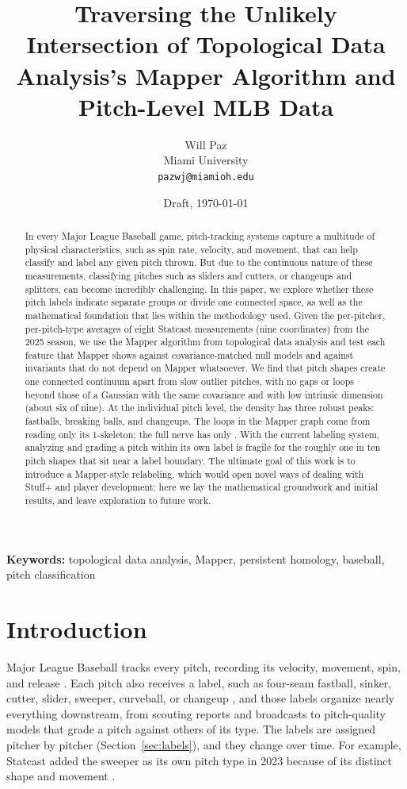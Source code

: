 \documentclass{article}
\title{Traversing the Unlikely Intersection of Topological Data Analysis's Mapper Algorithm and Pitch-Level MLB Data}
\author{Will Paz\\ Miami University\\ \texttt{pazwj@miamioh.edu}}
\date{Draft, \today}
\theoremstyle{definition}
\theoremstyle{remark}
\begin{document}
\maketitle

\begin{abstract}
In every Major League Baseball game, pitch-tracking systems capture a multitude of physical characteristics, such as spin rate, velocity, and movement, that can help classify and label any given pitch thrown.
But due to the continuous nature of these measurements, classifying pitches such as sliders and cutters, or changeups and splitters, can become incredibly challenging.
In this paper, we explore whether these pitch labels indicate separate groups or divide one connected space, as well as the mathematical foundation that lies within the methodology used.
Given the \NShapes{} per-pitcher, per-pitch-type averages of eight Statcast measurements (nine coordinates) from the 2025 season, we use the Mapper algorithm from topological data analysis and test each feature that Mapper shows against covariance-matched null models and against invariants that do not depend on Mapper whatsoever.
We find that pitch shapes create one connected continuum apart from slow outlier pitches, with no gaps or loops beyond those of a Gaussian with the same covariance and with low intrinsic dimension (about six of nine).
At the individual pitch level, the density has three robust peaks: fastballs, breaking balls, and changeups.
The \GraphBone{} loops in the Mapper graph come from reading only its 1-skeleton; the full nerve has only \NerveBone.
With the current labeling system, analyzing and grading a pitch within its own label is fragile for the roughly one in ten pitch shapes that sit near a label boundary.
The ultimate goal of this work is to introduce a Mapper-style relabeling, which would open novel ways of dealing with Stuff+ and player development; here we lay the mathematical groundwork and initial results, and leave exploration to future work.
\end{abstract}

\noindent\textbf{Keywords:} topological data analysis, Mapper, persistent homology, baseball, pitch classification

\section{Introduction}
Major League Baseball tracks every pitch, recording its velocity, movement, spin, and release \parencite{savantcsvdocs}.
Each pitch also receives a label, such as four-seam fastball, sinker, cutter, slider, sweeper, curveball, or changeup \parencite{mlbglossary_pitchtypes}, and those labels organize nearly everything downstream, from scouting reports and broadcasts to pitch-quality models that grade a pitch against others of its type.
The labels are assigned pitcher by pitcher (Section~\ref{sec:labels}), and they change over time. For example, Statcast added the sweeper as its own pitch type in 2023 because of its distinct shape and movement \parencite{mlbglossary_sweeper}.
\end{document}
